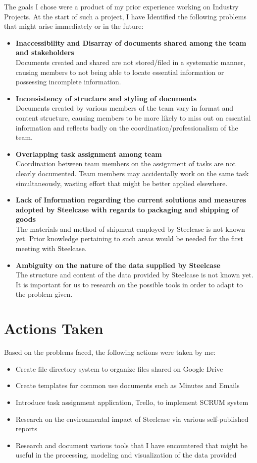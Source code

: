 \documentclass[a4paper, fleqn]{article}
\begin{document}
The goals I chose were a product of my prior experience working on Industry Projects. At the start of such a project, I have Identified the following problems that might arise immediately or in the future:
\begin{itemize}
\item \textbf{Inaccessibility and Disarray of documents shared among the team and stakeholders}\\
Documents created and shared are not stored/filed in a systematic manner, causing members to not being able to locate essential information or possessing incomplete information.
\item \textbf{Inconsistency of structure and styling of documents}\\
Documents created by various members of the team vary in format and content structure, causing members to be more likely to miss out on essential information and reflects badly on the coordination/professionalism of the team.
\item \textbf{Overlapping task assignment among team}\\
Coordination between team members on the assignment of tasks are not clearly documented. Team members may accidentally work on the same task simultaneously, wasting effort that might be better applied elsewhere.
\item \textbf{Lack of Information regarding the current solutions and measures adopted by Steelcase with regards to packaging and shipping of goods}\\
The materials and method of shipment employed by Steelcase is not known yet. Prior knowledge pertaining to such areas would be needed for the first meeting with Steelcase.
\item \textbf{Ambiguity on the nature of the data supplied by Steelcase}\\
The structure and content of the data provided by Steelcase is not known yet. It is important for us to research on the possible tools in order to adapt to the problem given.
\end{itemize}

\section{Actions Taken}

Based on the problems faced, the following actions were taken by me:
\begin{itemize}
\item Create file directory system to organize files shared on Google Drive
\item Create templates for common use documents such as Minutes and Emails
\item Introduce task assignment application, Trello, to implement SCRUM system
\item Research on the environmental impact of Steelcase via various self-published reports
\item Research and document various tools that I have encountered that might be useful in the processing, modeling and visualization of the data provided
\end{itemize}
\end{document}
